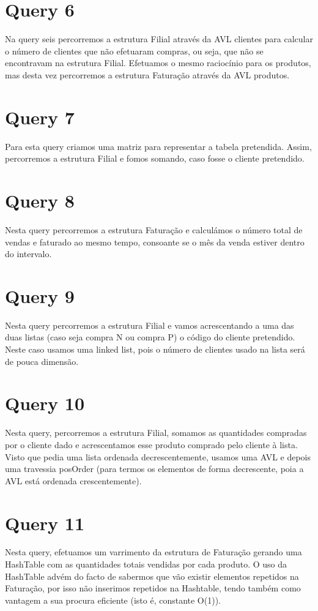 \documentclass[a4paper,11pt]{report}
\begin{document}
\section*{Query 6}
Na query seis percorremos a estrutura Filial através da AVL clientes para calcular o número de clientes que não efetuaram compras, ou seja, que não se encontravam na estrutura Filial.
Efetuamos o mesmo raciocínio para os produtos, mas desta vez percorremos a estrutura Faturação através da AVL produtos.

\section*{Query 7}
Para esta query criamos uma matriz para representar a tabela pretendida. Assim, percorremos a estrutura Filial e fomos somando, caso fosse o cliente pretendido.

\section*{Query 8}
Nesta query percorremos a estrutura Faturação e calculámos o número total de vendas e faturado ao mesmo tempo, consoante se o mês da venda estiver dentro do intervalo.

\section*{Query 9}
Nesta query percorremos a estrutura Filial e vamos acrescentando a uma das duas listas (caso seja compra N ou compra P) o código do cliente pretendido. Neste caso usamos uma linked list, pois o número de clientes usado na lista será de pouca dimensão.

\section*{Query 10}
Nesta query, percorremos a estrutura Filial, somamos as quantidades compradas por o cliente dado e acrescentamos esse produto comprado pelo cliente à lista. Visto que pedia uma lista ordenada decrescentemente, usamos uma AVL e depois uma travessia posOrder (para termos os elementos de forma decrescente, poia a AVL está ordenada crescentemente).

\section*{Query 11}
Nesta query, efetuamos um varrimento da estrutura de Faturação gerando uma HashTable com as quantidades totais vendidas por cada produto. O uso da HashTable advém do facto de sabermos que vão existir elementos repetidos na Faturação, por isso não inserimos repetidos na Hashtable, tendo também como vantagem a sua procura eficiente (isto é, constante O(1)).
\end{document}

